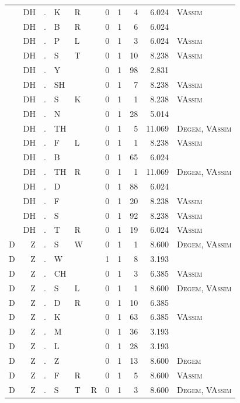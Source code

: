 \documentclass[12pt]{article}
\begin{document}
\begin{longtable}{r@{ } r@{ } c@{ } l@{ } l@{ } l@{ } r r r r l }
 & DH & . & K & R &  & 0 & 1 & 4 & 6.024 & \textsc{VAssim} \\
 & DH & . & B & R &  & 0 & 1 & 6 & 6.024 &  \\
 & DH & . & P & L &  & 0 & 1 & 3 & 6.024 & \textsc{VAssim} \\
 & DH & . & S & T &  & 0 & 1 & 10 & 8.238 & \textsc{VAssim} \\
 & DH & . & Y &  &  & 0 & 1 & 98 & 2.831 &  \\
 & DH & . & SH &  &  & 0 & 1 & 7 & 8.238 & \textsc{VAssim} \\
 & DH & . & S & K &  & 0 & 1 & 1 & 8.238 & \textsc{VAssim} \\
 & DH & . & N &  &  & 0 & 1 & 28 & 5.014 &  \\
 & DH & . & TH &  &  & 0 & 1 & 5 & 11.069 & \textsc{Degem}, \textsc{VAssim} \\
 & DH & . & F & L &  & 0 & 1 & 1 & 8.238 & \textsc{VAssim} \\
 & DH & . & B &  &  & 0 & 1 & 65 & 6.024 &  \\
 & DH & . & TH & R &  & 0 & 1 & 1 & 11.069 & \textsc{Degem}, \textsc{VAssim} \\
 & DH & . & D &  &  & 0 & 1 & 88 & 6.024 &  \\
 & DH & . & F &  &  & 0 & 1 & 20 & 8.238 & \textsc{VAssim} \\
 & DH & . & S &  &  & 0 & 1 & 92 & 8.238 & \textsc{VAssim} \\
 & DH & . & T & R &  & 0 & 1 & 19 & 6.024 & \textsc{VAssim} \\
D & Z & . & S & W &  & 0 & 1 & 1 & 8.600 & \textsc{Degem}, \textsc{VAssim} \\
D & Z & . & W &  &  & 1 & 1 & 8 & 3.193 &  \\
D & Z & . & CH &  &  & 0 & 1 & 3 & 6.385 & \textsc{VAssim} \\
D & Z & . & S & L &  & 0 & 1 & 1 & 8.600 & \textsc{Degem}, \textsc{VAssim} \\
D & Z & . & D & R &  & 0 & 1 & 10 & 6.385 &  \\
D & Z & . & K &  &  & 0 & 1 & 63 & 6.385 & \textsc{VAssim} \\
D & Z & . & M &  &  & 0 & 1 & 36 & 3.193 &  \\
D & Z & . & L &  &  & 0 & 1 & 28 & 3.193 &  \\
D & Z & . & Z &  &  & 0 & 1 & 13 & 8.600 & \textsc{Degem} \\
D & Z & . & F & R &  & 0 & 1 & 5 & 8.600 & \textsc{VAssim} \\
D & Z & . & S & T & R & 0 & 1 & 3 & 8.600 & \textsc{Degem}, \textsc{VAssim} \\

\end{longtable}
\end{document}
